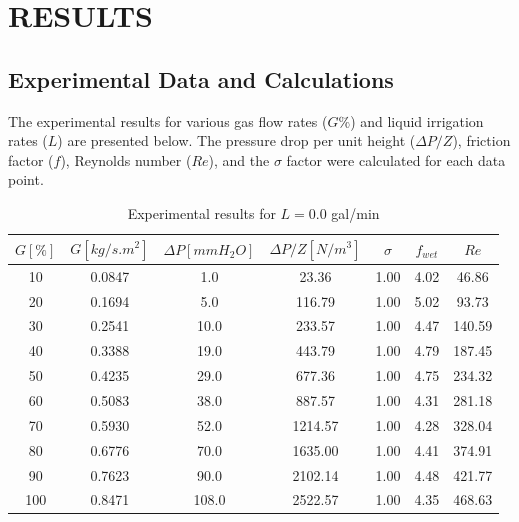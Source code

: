 \section{RESULTS}

\subsection{Experimental Data and Calculations}
The experimental results for various gas flow rates ($G\%$) and liquid irrigation rates ($L$) are presented below. The pressure drop per unit height ($\Delta P/Z$), friction factor ($f$), Reynolds number ($Re$), and the $\sigma$ factor were calculated for each data point.

\begin{table}[H]
    \centering
    \caption{Experimental results for $L=0.0$ gal/min}
    \begin{tabular}{ccccccc}
        \hline
        $G [\%]$ & $G [kg/s.m^2]$ & $\Delta P [mmH_2O]$ & $\Delta P/Z [N/m^3]$ & $\sigma$ & $f_{wet}$ & $Re$ \\
        \hline
        10 & 0.0847 & 1.0 & 23.36 & 1.00 & 4.02 & 46.86 \\
        20 & 0.1694 & 5.0 & 116.79 & 1.00 & 5.02 & 93.73 \\
        30 & 0.2541 & 10.0 & 233.57 & 1.00 & 4.47 & 140.59 \\
        40 & 0.3388 & 19.0 & 443.79 & 1.00 & 4.79 & 187.45 \\
        50 & 0.4235 & 29.0 & 677.36 & 1.00 & 4.75 & 234.32 \\
        60 & 0.5083 & 38.0 & 887.57 & 1.00 & 4.31 & 281.18 \\
        70 & 0.5930 & 52.0 & 1214.57 & 1.00 & 4.28 & 328.04 \\
        80 & 0.6776 & 70.0 & 1635.00 & 1.00 & 4.41 & 374.91 \\
        90 & 0.7623 & 90.0 & 2102.14 & 1.00 & 4.48 & 421.77 \\
        100 & 0.8471 & 108.0 & 2522.57 & 1.00 & 4.35 & 468.63 \\
        \hline
    \end{tabular}
\end{table}

